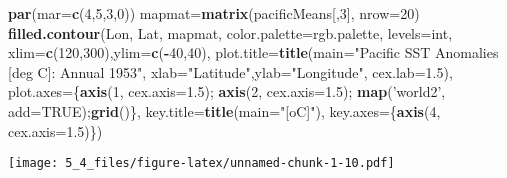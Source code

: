 \documentclass[]{article}
\newenvironment{Shaded}{\begin{snugshade}}{\end{snugshade}}
\newcommand{\KeywordTok}[1]{\textcolor[rgb]{0.13,0.29,0.53}{\textbf{#1}}}
\newcommand{\DataTypeTok}[1]{\textcolor[rgb]{0.13,0.29,0.53}{#1}}
\newcommand{\DecValTok}[1]{\textcolor[rgb]{0.00,0.00,0.81}{#1}}
\newcommand{\FloatTok}[1]{\textcolor[rgb]{0.00,0.00,0.81}{#1}}
\newcommand{\StringTok}[1]{\textcolor[rgb]{0.31,0.60,0.02}{#1}}
\newcommand{\OtherTok}[1]{\textcolor[rgb]{0.56,0.35,0.01}{#1}}
\newcommand{\OperatorTok}[1]{\textcolor[rgb]{0.81,0.36,0.00}{\textbf{#1}}}
\newcommand{\NormalTok}[1]{#1}
\begin{document}
\begin{Shaded}
\begin{Highlighting}[]
\KeywordTok{par}\NormalTok{(}\DataTypeTok{mar=}\KeywordTok{c}\NormalTok{(}\DecValTok{4}\NormalTok{,}\DecValTok{5}\NormalTok{,}\DecValTok{3}\NormalTok{,}\DecValTok{0}\NormalTok{))}
\NormalTok{mapmat=}\KeywordTok{matrix}\NormalTok{(pacificMeans[,}\DecValTok{3}\NormalTok{], }\DataTypeTok{nrow=}\DecValTok{20}\NormalTok{)}
\KeywordTok{filled.contour}\NormalTok{(Lon, Lat, mapmat, }\DataTypeTok{color.palette=}\NormalTok{rgb.palette, }\DataTypeTok{levels=}\NormalTok{int,}
               \DataTypeTok{xlim=}\KeywordTok{c}\NormalTok{(}\DecValTok{120}\NormalTok{,}\DecValTok{300}\NormalTok{),}\DataTypeTok{ylim=}\KeywordTok{c}\NormalTok{(}\OperatorTok{-}\DecValTok{40}\NormalTok{,}\DecValTok{40}\NormalTok{),}
               \DataTypeTok{plot.title=}\KeywordTok{title}\NormalTok{(}\DataTypeTok{main=}\StringTok{"Pacific SST Anomalies [deg C]: Annual 1953"}\NormalTok{,}
                                \DataTypeTok{xlab=}\StringTok{"Latitude"}\NormalTok{,}\DataTypeTok{ylab=}\StringTok{"Longitude"}\NormalTok{, }\DataTypeTok{cex.lab=}\FloatTok{1.5}\NormalTok{),}
               \DataTypeTok{plot.axes=}\NormalTok{\{}\KeywordTok{axis}\NormalTok{(}\DecValTok{1}\NormalTok{, }\DataTypeTok{cex.axis=}\FloatTok{1.5}\NormalTok{); }\KeywordTok{axis}\NormalTok{(}\DecValTok{2}\NormalTok{, }\DataTypeTok{cex.axis=}\FloatTok{1.5}\NormalTok{);}
                 \KeywordTok{map}\NormalTok{(}\StringTok{'world2'}\NormalTok{, }\DataTypeTok{add=}\OtherTok{TRUE}\NormalTok{);}\KeywordTok{grid}\NormalTok{()\},}
               \DataTypeTok{key.title=}\KeywordTok{title}\NormalTok{(}\DataTypeTok{main=}\StringTok{"[oC]"}\NormalTok{),}
               \DataTypeTok{key.axes=}\NormalTok{\{}\KeywordTok{axis}\NormalTok{(}\DecValTok{4}\NormalTok{, }\DataTypeTok{cex.axis=}\FloatTok{1.5}\NormalTok{)\})}
\end{Highlighting}
\end{Shaded}

\texttt{[image: 5\_4\_files/figure-latex/unnamed-chunk-1-10.pdf]}
\end{document}
